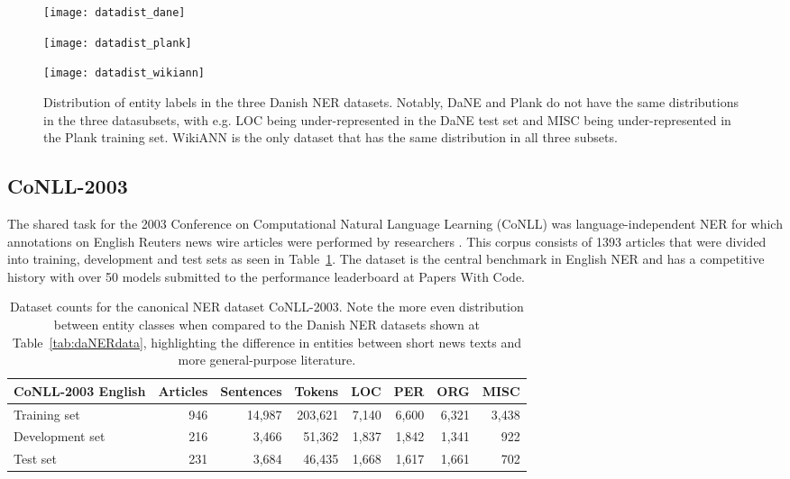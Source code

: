 \documentclass[main.tex]{subfiles}
\begin{document}
\begin{figure}[H]
    \centering
   	\begin{minipage}[t]{0.32\textwidth}
       \texttt{[image: datadist\_dane]}
    \end{minipage}\hfill
    \begin{minipage}[t]{0.32\textwidth}
        \texttt{[image: datadist\_plank]}
    \end{minipage}\hfill
    \begin{minipage}[t]{0.32\textwidth}
        \texttt{[image: datadist\_wikiann]}
    \end{minipage}
    \caption{
        Distribution of entity labels in the three Danish NER datasets.
        Notably, DaNE and Plank do not have the same distributions in the three datasubsets, with e.g. LOC being under-represented in the DaNE test set and MISC being under-represented in the Plank training set.
        WikiANN is the only dataset that has the same distribution in all three subsets.
    }
    \label{fig:dadatadist}
\end{figure}\noindent

\subsection{CoNLL-2003}
The shared task for the 2003 Conference on Computational Natural Language Learning (CoNLL) was language-independent NER for which annotations on English Reuters news wire articles were performed by researchers \cite{tjang2003conll}.
This corpus consists of 1393 articles that were divided into training, development and test sets as seen in Table~\ref{tab:conll2003}.
The dataset is the central benchmark in English NER \cite[Sec. 4.3]{yamada2020luke} and has a competitive history with over 50 models submitted to the performance leaderboard at Papers With Code\footnotemark.
\begin{table}[H]
    \centering
    \begin{tabular}{l|rrr|rrrr}
    CoNLL-2003 English  & Articles  & Sentences  & Tokens   & LOC   & PER   & ORG   & MISC  \\ \hline
    Training set        & 946       & 14,987     & 203,621  & 7,140  & 6,600  & 6,321  & 3,438   \\
    Development set     & 216       & 3,466      & 51,362   & 1,837  & 1,842  & 1,341  & 922    \\
    Test set            & 231       & 3,684      & 46,435   & 1,668  & 1,617  & 1,661  & 702    \\
    \end{tabular}
    \caption{
        Dataset counts for the canonical NER dataset CoNLL-2003.
        Note the more even distribution between entity classes when compared to the Danish NER datasets shown at Table~\ref{tab:daNERdata}, highlighting the difference in entities between short news texts and more general-purpose literature.
    }
    \label{tab:conll2003}
\end{table}
\end{document}
